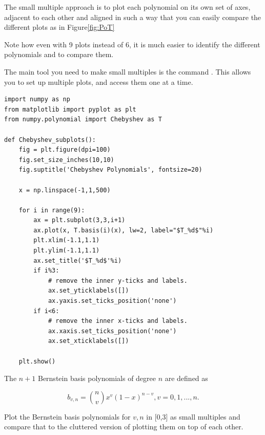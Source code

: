 The small multiple approach is to plot each polynomial on its own set of axes, adjacent to each other and aligned in such a way that you can easily compare the different plots as in Figure\ref{fig:PoT}


Note how even with 9 plots instead of 6, it is much easier to identify the different polynomials and to compare them.

The main tool you need to make small multiples is the command .  This allows you to set up multiple plots, and access them one at a time.

\begin{lstlisting}
import numpy as np
from matplotlib import pyplot as plt
from numpy.polynomial import Chebyshev as T

def Chebyshev_subplots():
    fig = plt.figure(dpi=100)
    fig.set_size_inches(10,10)
    fig.suptitle('Chebyshev Polynomials', fontsize=20)

    x = np.linspace(-1,1,500)

    for i in range(9):
        ax = plt.subplot(3,3,i+1)
        ax.plot(x, T.basis(i)(x), lw=2, label="$T_%d$"%i)
        plt.xlim(-1.1,1.1)
        plt.ylim(-1.1,1.1)
        ax.set_title('$T_%d$'%i)
        if i%3:
            # remove the inner y-ticks and labels.
            ax.set_yticklabels([])
            ax.yaxis.set_ticks_position('none')
        if i<6:
            # remove the inner x-ticks and labels.
            ax.xaxis.set_ticks_position('none')
            ax.set_xticklabels([]) 

    plt.show()
\end{lstlisting}


\begin{problem}

The $n+1$ Bernstein basis polynomials of degree $n$ are defined as 

$$b_{v,n} = {{n} \choose {v}} x^v (1-x)^{n-v}, v = 0, 1,..., n.$$


Plot the Bernstein basis polynomials for $v,n$ in [0,3] as small multiples and compare that to the cluttered version of plotting them on top of each other.

\end{problem}

